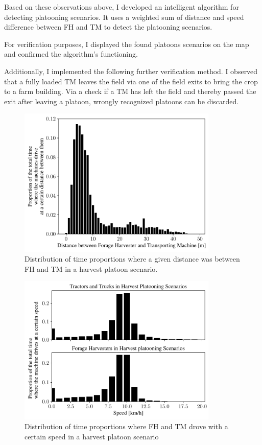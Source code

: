 Based on these observations above, I developed an intelligent algorithm for detecting platooning scenarios. It uses a weighted sum of distance and speed difference between \ac{FH} and \ac{TM} to detect the platooning scenarios.

For verification purposes, I displayed the found platoons scenarios on the map and confirmed the algorithm's functioning. 

Additionally, I implemented the following further verification method. 
I observed that a fully loaded \ac{TM} leaves the field via one of the field exits to bring the crop to a farm building. Via a
check if a \ac{TM} has left the field and thereby passed the exit after leaving a platoon,
wrongly recognized platoons can be discarded.

\begin{figure}%
	\centering
	\includegraphics[width=0.85\textwidth]{figures/distanceHarvestSzenario.pdf}
	\caption{Distribution of time proportions where a given distance was between \ac{FH} and \ac{TM} in a harvest platoon scenario.}%
	\label{fig:distance}%
\end{figure}
\begin{figure}%
	\centering
	\includegraphics[width=0.85\textwidth]{figures/speedHarvestSzenario.pdf}
	\caption{Distribution of time proportions where \ac{FH} and \ac{TM} drove with a certain speed in a harvest platoon scenario}%
	\label{fig:speed}%
\end{figure}

